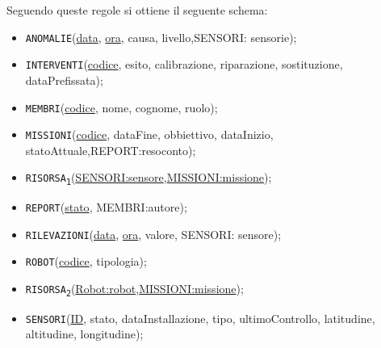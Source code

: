 Seguendo queste regole si ottiene il seguente schema:
\begin{itemize}
\item \texttt{ANOMALIE}(\underline{data}, \underline{ora}, causa, livello,SENSORI: sensorie);
\item \texttt{INTERVENTI}(\underline{codice}, esito, calibrazione, riparazione, sostituzione, dataPrefissata);
\item \texttt{MEMBRI}(\underline{codice}, nome, cognome, ruolo);
\item \texttt{MISSIONI}(\underline{codice}, dataFine, obbiettivo, dataInizio, statoAttuale,REPORT:resoconto);
\item \texttt{RISORSA\textsubscript{1}}(\underline{SENSORI:sensore},\underline{MISSIONI:missione});
\item \texttt{REPORT}(\underline{stato}, MEMBRI:autore);
\item \texttt{RILEVAZIONI}(\underline{data}, \underline{ora}, valore, SENSORI: sensore);
\item \texttt{ROBOT}(\underline{codice}, tipologia);
\item \texttt{RISORSA\textsubscript{2}}(\underline{Robot:robot},\underline{MISSIONI:missione});
\item \texttt{SENSORI}(\underline{ID}, stato, dataInstallazione, tipo, ultimoControllo, latitudine, altitudine, longitudine);
\end{itemize}

